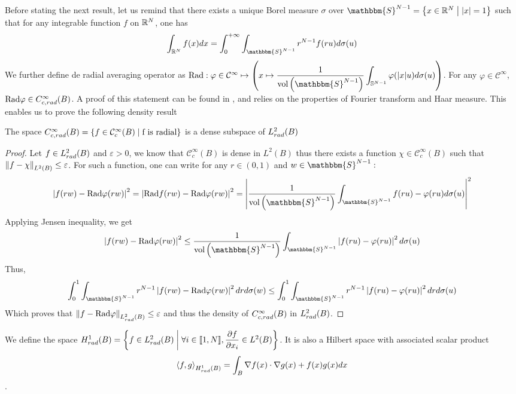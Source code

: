 \documentclass[11pt,a4paper]{article}
\begin{document}
Before stating the next result, let us remind that there exists a unique Borel measure $\sigma$ over $\mathbbm{S}^{N-1} = \enstq{x\in \RN}{|x| = 1}$ such that for any integrable function $f$ on $\mathbb{R}^N$, one has
\[ \int_{\RN} f(x)dx = \int_{0}^{+\infty} \int_{\mathbbm{S}^{N-1}}r^{N-1}f(ru)d\sigma(u)\]
We further define de radial averaging operator as $\text{Rad} : \varphi\in \mathcal{C}^{\infty} \mapsto \left(x\mapsto\displaystyle \frac{1}{\text{vol}\left(\mathbbm{S}^{N-1}\right)}\int_{\mathbb{S}^{N-1}}\varphi(|x|u)d\sigma(u) \right)$. For any $\varphi \in \mathcal{C}^{\infty}$, $\text{Rad}\varphi \in C^\infty_{c,rad}(B)$. A proof of this statement can be found in \cite{SphericalAverage}, and relies on the properties of Fourier transform and Haar measure.
This enables us to prove the following density result
\begin{Prop} The space $C^\infty_{c,rad}(B) = \left\{f \in \mathcal{C}_c^\infty(B)\mathrel{}\middle|\mathrel{}\text{f is radial}\right\}$ is a dense subspace of $L^2_{rad}(B)$

\end{Prop}
\begin{proof}
Let $f \in L^2_{rad}(B)$ and $\varepsilon >0$, we know that $\mathcal{C}_c^\infty(B)$ is dense in $L^2(B)$ thus there exists a function $\chi \in \mathcal{C}_c^\infty(B)$ such that $\left\|f - \chi\right\|_{L^2(B)} \leq \varepsilon$. For such a function, one can write for any $r \in (0,1)$ and $w \in \mathbbm{S}^{N-1} : $\[\left|f(rw) - \text{Rad}\varphi(rw)\right|^2 = \left|\text{Rad} f(rw) - \text{Rad}\varphi(rw)\right|^2 = \left|\frac{1}{\text{vol}\left(\mathbbm{S}^{N-1}\right)} \int_{\mathbbm{S}^{N-1}}f(ru) - \varphi(ru)d\sigma(u) \right|^2 \]
Applying Jensen inequality, we get \[\left|f(rw) - \text{Rad}\varphi(rw)\right|^2 \leq \frac{1}{\text{vol}\left(\mathbbm{S}^{N-1}\right)} \int_{\mathbbm{S}^{N-1}}\left|f(ru) - \varphi(ru) \right|^2 d\sigma(u)\]
Thus, \[ \int_{0}^1 \int_{\mathbbm{S}^{N-1}} r^{N-1}\left| f(rw) - \text{Rad}\varphi(rw)\right|^2 dr d\sigma(w) \leq \int_{0}^1 \int_{\mathbbm{S}^{N-1}} r^{N-1}\left| f(ru) - \varphi(ru)\right|^2 dr d\sigma(u)\]
Which proves that $\left\|f - \text{Rad}\varphi\right\|_{L^2_{rad}(B)} \leq \varepsilon$ and thus the density of $C^\infty_{c,rad}(B)$ in $L^2_{rad}(B)$.  
\end{proof}
\begin{Def} We define the space $H^1_{rad}(B) = \left\{f \in L^2_{rad}(B)\mathrel{}\middle|\mathrel{}\forall i\in \llbracket 1,N \rrbracket, \dfrac{\partial f}{\partial x_i}\in L^2(B)\right\}$. It is also a Hilbert space with associated scalar product \[\left\langle f,g\right\rangle_{H^1_{rad}(B)} = \int_{B} \nabla f(x) \cdot \nabla g(x) + f(x)g(x)dx\]. 
\end{Def}
\end{document}
